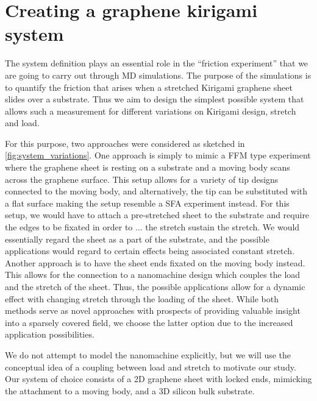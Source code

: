 \chapter{Creating a graphene kirigami system}\label{chap:system}

The system definition plays an essential role in the ``friction experiment'' that we are going to carry out through \acrshort{MD} simulations. The purpose of the simulations is to quantify the friction that arises when a stretched Kirigami graphene sheet slides over a substrate. Thus we aim to design the simplest possible system that allows such a measurement for different variations on Kirigami design, stretch and load.

For this purpose, two approaches were considered as sketched in \cref{fig:system_variations}. One approach is simply to mimic a \acrshort{FFM} type experiment where the graphene sheet is resting on a substrate and a moving body  scans across the graphene surface. This setup allows for a variety of tip designs connected to the moving body, and alternatively, the
tip can be substituted with a flat surface making the setup resemble a
\acrshort{SFA} experiment instead. For this setup, we would have to attach a pre-stretched sheet to the substrate and require the edges to be fixated in order to ... the stretch sustain the stretch. We would essentially regard the sheet as a part of the substrate, and the possible applications would regard to certain effects being associated constant stretch. Another approach is to have the sheet ends fixated on the moving body instead. This allows for the connection to a nanomachine design which couples the load and the stretch of the sheet. Thus, the possible applications allow for a dynamic effect with changing stretch through the loading of the sheet. While both methods serve as novel approaches with prospects of providing valuable insight into a sparsely covered field, we choose the latter option due to the increased application possibilities.

We do not attempt to model the nanomachine explicitly, but we will use the conceptual idea of a coupling between load and stretch to motivate our study. Our system of choice consists of a 2D graphene sheet with locked ends, mimicking the attachment to a moving body, and a 3D silicon bulk substrate. 




